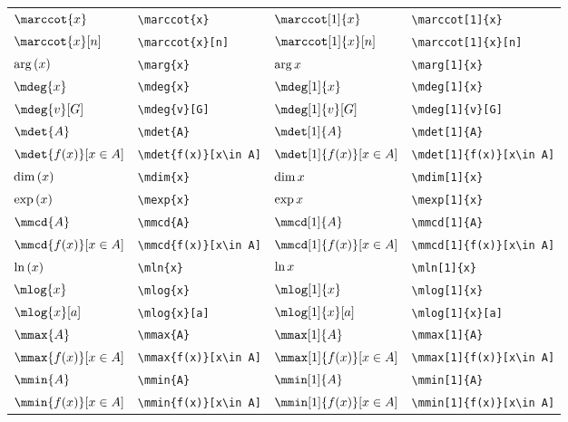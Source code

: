 \documentclass[10pt, a4paper]{article}
\newcommand{\ds}{\displaystyle}
\newcommand{\marg}[2][0]{
	\ifthenelse{ \equal{#1}{0} }{\arg\left( #2 \right)}{\arg{#2}}
}
\newcommand{\mdim}[2][0]{
	\ifthenelse{ \equal{#1}{0} }{\dim\left( #2 \right)}{\dim{#2}}
}
\newcommand{\mexp}[2][0]{
	\ifthenelse{ \equal{#1}{0} }{\exp\left( #2 \right)}{\exp{#2}}
}
\newcommand{\mln}[2][0]{
	\ifthenelse{ \equal{#1}{0} }{\ln\left( #2 \right)}{\ln{#2}}
}
\begin{document}
\begin{center}
\begin{tabular}{ll|ll}
		$ \marccot{x} $ & \texttt{\textbackslash marccot\{x\}} & $ \marccot[1]{x} $ & \texttt{\textbackslash marccot[1]\{x\}}\\
		$ \marccot{x}[n] $ & \texttt{\textbackslash marccot\{x\}[n]} & $ \marccot[1]{x}[n] $ & \texttt{\textbackslash marccot[1]\{x\}[n]}\\
		$ \marg{x} $ & \texttt{\textbackslash marg\{x\}} & $ \marg[1]{x} $ & \texttt{\textbackslash marg[1]\{x\}}\\
		$ \mdeg{x} $ & \texttt{\textbackslash mdeg\{x\}} & $ \mdeg[1]{x} $ & \texttt{\textbackslash mdeg[1]\{x\}}\\
		$ \mdeg{v}[G] $ & \texttt{\textbackslash mdeg\{v\}[G]} & $ \mdeg[1]{v}[G] $ & \texttt{\textbackslash mdeg[1]\{v\}[G]}\\
		$ \mdet{A} $ & \texttt{\textbackslash mdet\{A\}} & $ \mdet[1]{A} $ & \texttt{\textbackslash mdet[1]\{A\}} \\
		$ \ds\mdet{f(x)}[x\in A] $ & \texttt{\textbackslash mdet\{f(x)\}[x\textbackslash in A]} & $ \ds\mdet[1]{f(x)}[x\in A] $ & \texttt{\textbackslash mdet[1]\{f(x)\}[x\textbackslash in A]}\\
		$ \mdim{x} $ & \texttt{\textbackslash mdim\{x\}} & $ \mdim[1]{x} $ & \texttt{\textbackslash mdim[1]\{x\}}\\
		$ \mexp{x} $ & \texttt{\textbackslash mexp\{x\}} & $ \mexp[1]{x} $ & \texttt{\textbackslash mexp[1]\{x\}}\\
		$ \mmcd{A} $ & \texttt{\textbackslash mmcd\{A\}} & $ \mmcd[1]{A} $ & \texttt{\textbackslash mmcd[1]\{A\}} \\
		$ \ds\mmcd{f(x)}[x\in A] $ & \texttt{\textbackslash mmcd\{f(x)\}[x\textbackslash in A]} & $ \ds\mmcd[1]{f(x)}[x\in A] $ & \texttt{\textbackslash mmcd[1]\{f(x)\}[x\textbackslash in A]}\\
		$ \mln{x} $ & \texttt{\textbackslash mln\{x\}} & $ \mln[1]{x} $ & \texttt{\textbackslash mln[1]\{x\}}\\
		$ \mlog{x} $ & \texttt{\textbackslash mlog\{x\}} & $ \mlog[1]{x} $ & \texttt{\textbackslash mlog[1]\{x\}} \\
		$ \ds\mlog{x}[a] $ & \texttt{\textbackslash mlog\{x\}[a]} & $ \ds\mlog[1]{x}[a] $ & \texttt{\textbackslash mlog[1]\{x\}[a]}\\
		$ \mmax{A} $ & \texttt{\textbackslash mmax\{A\}} & $ \mmax[1]{A} $ & \texttt{\textbackslash mmax[1]\{A\}} \\
		$ \ds\mmax{f(x)}[x\in A] $ & \texttt{\textbackslash mmax\{f(x)\}[x\textbackslash in A]} & $ \ds\mmax[1]{f(x)}[x\in A] $ & \texttt{\textbackslash mmax[1]\{f(x)\}[x\textbackslash in A]}\\
		$ \mmin{A} $ & \texttt{\textbackslash mmin\{A\}} & $ \mmin[1]{A} $ & \texttt{\textbackslash mmin[1]\{A\}} \\
		$ \ds\mmin{f(x)}[x\in A] $ & \texttt{\textbackslash mmin\{f(x)\}[x\textbackslash in A]} & $ \ds\mmin[1]{f(x)}[x\in A] $ & \texttt{\textbackslash mmin[1]\{f(x)\}[x\textbackslash in A]}\\
	\end{tabular}
\end{center}
\end{document}

